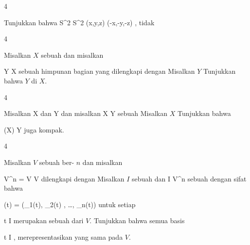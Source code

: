 {4}
{

Tunjukkan bahwa
\maabbeledisp {} {S^2} {S^2
} {(x,y,z)} {(-x,-y,-z)
} {,}
tidak

}
{} {}

{4}
{

Misalkan $X$ sebuah
dan misalkan

\mavergleichskette
{\vergleichskette
{Y
}
{ \subseteq }{ X
}
{  }{
}
{    }{
}
{   }{
}
}
{}{}{}
sebuah himpunan bagian yang dilengkapi dengan
Misalkan $Y$
Tunjukkan bahwa $Y$
di $X$.

}
{} {}

{4}
{

Misalkan
\mathkor {} {X} {dan} {Y} {}
dan misalkan
\maabbdisp {\varphi} { X } { Y
} {}
sebuah
Misalkan $X$
Tunjukkan bahwa

\mavergleichskette
{\vergleichskette
{ \varphi(X)
}
{ \subseteq }{ Y
}
{  }{
}
{    }{
}
{   }{
}
}
{}{}{}
juga kompak.

}
{} {}

{4}
{

Misalkan $V$ sebuah
ber-
$n$ dan misalkan

\mavergleichskette
{\vergleichskette
{ V^n
}
{ = }{ V \times \cdots \times V
}
{  }{
}
{    }{
}
{   }{
}
}
{}{}{}
dilengkapi dengan
Misalkan $I$ sebuah
dan
\maabbdisp {\varphi} { I } { V^n
} {}
sebuah
dengan sifat bahwa

\mavergleichskettedisp
{\vergleichskette
{ \varphi(t)
}
{ =} { (\varphi_1(t), \varphi_2(t) , \ldots , \varphi_n(t))
}
{ } {
}
{ } {
}
{ } {
}
}
{}{}{}
untuk setiap

\mavergleichskette
{\vergleichskette
{ t
}
{ \in }{ I
}
{  }{
}
{    }{
}
{   }{
}
}
{}{}{}
merupakan sebuah
dari $V$. Tunjukkan bahwa semua basis

 {}
 {t \in I} {}
 {} {} {} {,}
merepresentasikan
yang sama pada $V$.

}
{} {}
